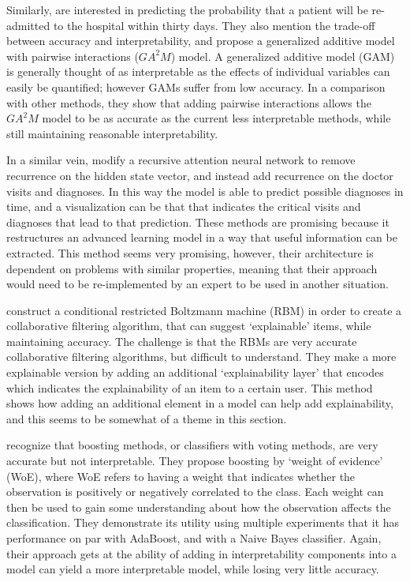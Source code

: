     Similarly, \citet{Caruana2015-za} are interested in predicting the probability that a patient will be re-admitted to the hospital within thirty days. They also mention the trade-off between accuracy and interpretability, and propose a generalized additive model with pairwise interactions ($GA^2M$) model. A generalized additive model (GAM) is generally thought of as interpretable as the effects of individual variables can easily be quantified; however GAMs suffer from low accuracy. In a comparison with other methods, they show that adding pairwise interactions allows the $GA^2M$ model to be as accurate as the current less interpretable methods, while still maintaining reasonable interpretability.

    In a similar vein, \citet{Choi2016-by} modify a recursive attention neural network to remove recurrence on the hidden state vector, and instead add recurrence on the doctor visits and diagnoses. In this way the model is able to predict possible diagnoses in time, and a visualization can be that that indicates the critical visits and diagnoses that lead to that prediction. These methods are promising because it restructures an advanced learning model in a way that useful information can be extracted. This method seems very promising, however, their architecture is dependent on problems with similar properties, meaning that their approach would need to be re-implemented by an expert to be used in another situation.

    \citet{Abdollahi2016-vn} construct a conditional restricted Boltzmann machine (RBM) in order to create a collaborative filtering algorithm, that can suggest `explainable' items, while maintaining accuracy. The challenge is that the RBMs are very accurate collaborative filtering algorithms, but difficult to understand. They make a more explainable version by adding an additional `explainability layer' that encodes which indicates the explainability of an item to a certain user. This method shows how adding an additional element in a model can help add explainability, and this seems to be somewhat of a theme in this section.

    \citet{Ridgeway1998-lv} recognize that boosting methods, or classifiers with voting methods, are very accurate but not interpretable. They propose boosting by `weight of evidence' (WoE), where WoE refers to having a weight that indicates whether the observation is positively or negatively correlated to the class. Each weight can then be used to gain some understanding about how the observation affects the classification. They demonstrate its utility using multiple experiments that it has performance on par with AdaBoost, and with a Naive Bayes classifier.  Again, their approach gets at the ability of adding in interpretability components into a model can yield a more interpretable model, while losing very little accuracy.

